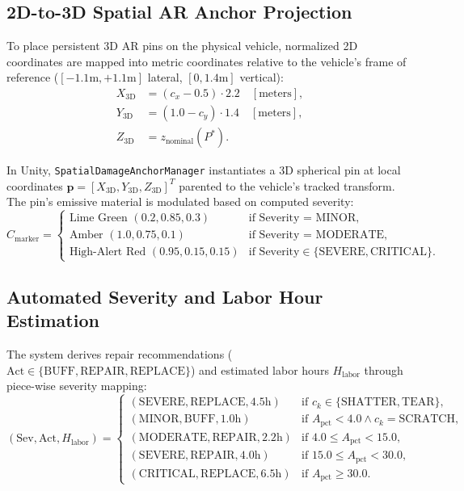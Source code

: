 \documentclass[10pt,journal,compsoc]{IEEEtran}
\begin{document}
\subsection{2D-to-3D Spatial AR Anchor Projection}
To place persistent 3D AR pins on the physical vehicle, normalized 2D coordinates are mapped into metric coordinates relative to the vehicle's frame of reference ($[-1.1\text{m}, +1.1\text{m}]$ lateral, $[0, 1.4\text{m}]$ vertical):
\begin{align}
    X_{\text{3D}} &= (c_x - 0.5) \cdot 2.2 \quad [\text{meters}], \\
    Y_{\text{3D}} &= (1.0 - c_y) \cdot 1.4 \quad [\text{meters}], \\
    Z_{\text{3D}} &= z_{\text{nominal}}(P^*).
\end{align}

In Unity, \texttt{SpatialDamageAnchorManager} instantiates a 3D spherical pin at local coordinates $\mathbf{p} = [X_{\text{3D}}, Y_{\text{3D}}, Z_{\text{3D}}]^T$ parented to the vehicle's tracked transform. The pin's emissive material is modulated based on computed severity:
\begin{equation}
    C_{\text{marker}} = \begin{cases}
        \text{Lime Green } (0.2, 0.85, 0.3) & \text{if Severity = MINOR}, \\
        \text{Amber } (1.0, 0.75, 0.1) & \text{if Severity = MODERATE}, \\
        \text{High-Alert Red } (0.95, 0.15, 0.15) & \text{if Severity} \in \{\text{SEVERE}, \text{CRITICAL}\}.
    \end{cases}
\end{equation}

\subsection{Automated Severity and Labor Hour Estimation}
The system derives repair recommendations ($\text{Act} \in \{\text{BUFF}, \text{REPAIR}, \text{REPLACE}\}$) and estimated labor hours $H_{\text{labor}}$ through piece-wise severity mapping:
\begin{equation}
    (\text{Sev}, \text{Act}, H_{\text{labor}}) = \begin{cases}
        (\text{SEVERE}, \text{REPLACE}, 4.5\text{h}) & \text{if } c_k \in \{\text{SHATTER}, \text{TEAR}\}, \\
        (\text{MINOR}, \text{BUFF}, 1.0\text{h}) & \text{if } A_{\text{pct}} < 4.0 \land c_k = \text{SCRATCH}, \\
        (\text{MODERATE}, \text{REPAIR}, 2.2\text{h}) & \text{if } 4.0 \le A_{\text{pct}} < 15.0, \\
        (\text{SEVERE}, \text{REPAIR}, 4.0\text{h}) & \text{if } 15.0 \le A_{\text{pct}} < 30.0, \\
        (\text{CRITICAL}, \text{REPLACE}, 6.5\text{h}) & \text{if } A_{\text{pct}} \ge 30.0.
    \end{cases}
\end{equation}
\end{document}
